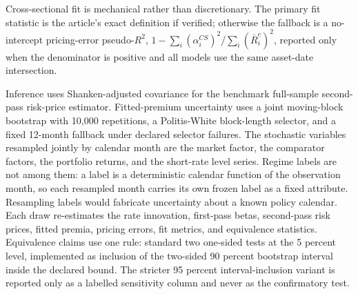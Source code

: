 \documentclass[11pt]{article}
\begin{document}
Cross-sectional fit is mechanical rather than discretionary. The primary fit
statistic is the article's exact definition if verified; otherwise the fallback
is a no-intercept pricing-error pseudo-\(R^2\), \(1-\sum_i %
(\alpha^{CS}_i)^2/\sum_i(\bar R^e_i)^2\), reported only when the denominator is %
positive and all models use the same asset-date intersection. %

Inference uses Shanken-adjusted covariance for the benchmark full-sample
second-pass risk-price estimator. Fitted-premium uncertainty uses a joint
moving-block bootstrap with 10,000 repetitions, a Politis-White block-length %
selector, and a fixed 12-month fallback under declared selector failures. The %
stochastic variables resampled jointly by calendar month are the market factor,
the comparator factors, the portfolio returns, and the short-rate level series.
Regime labels are not among them: a label is a deterministic calendar function
of the observation month, so each resampled month carries its own frozen label
as a fixed attribute. Resampling labels would fabricate uncertainty about a
known policy calendar. Each draw re-estimates %
the rate innovation, first-pass betas, second-pass risk prices, fitted premia,
pricing errors, fit metrics, and equivalence statistics. Equivalence claims use
one rule: standard two one-sided tests at the 5 percent level, implemented as %
inclusion of the two-sided 90 percent bootstrap interval inside the declared %
bound. The stricter 95 percent interval-inclusion variant is reported only as a %
labelled sensitivity column and never as the confirmatory test. %
\end{document}
